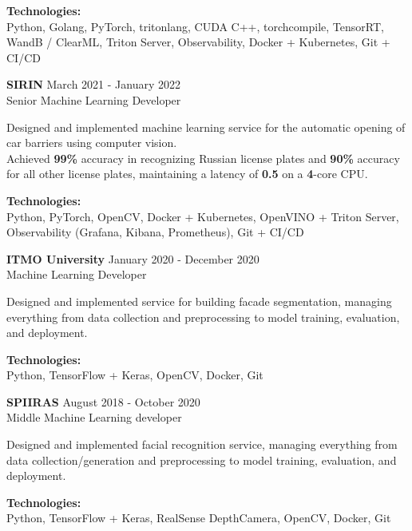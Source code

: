 \textbf{Technologies:} \\
Python, Golang, PyTorch, tritonlang, CUDA C++, torchcompile, TensorRT, WandB / ClearML, Triton Server, Observability, Docker + Kubernetes, Git + CI/CD

\textbf{SIRIN} \hfill March 2021 - January 2022 \\
Senior Machine Learning Developer

Designed and implemented machine learning service for the automatic opening of car barriers using computer vision. \\
Achieved \textbf{99\%} accuracy in recognizing Russian license plates and \textbf{90\%} accuracy for all other license plates, maintaining a latency of \textbf{0.5} on a \textbf{4}-core CPU.

\textbf{Technologies:} \\
Python, PyTorch, OpenCV, Docker + Kubernetes, OpenVINO + Triton Server, Observability (Grafana, Kibana, Prometheus), Git + CI/CD

\textbf{ITMO University} \hfill January 2020 - December 2020 \\
Machine Learning Developer

Designed and implemented service for building facade segmentation, managing everything from data collection and preprocessing to model training, evaluation, and deployment.

\textbf{Technologies:} \\
Python, TensorFlow + Keras, OpenCV, Docker, Git

\textbf{SPIIRAS} \hfill August 2018 - October 2020 \\
Middle Machine Learning developer

Designed and implemented facial recognition service, managing everything from data collection/generation and preprocessing to model training, evaluation, and deployment.

\textbf{Technologies:} \\
Python, TensorFlow + Keras, RealSense DepthCamera, OpenCV, Docker, Git

\endinput
